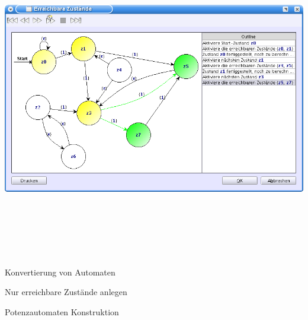 {
  \begin{center}
    \includegraphics[height=14cm]{../images/reachable_states.png}
  \end{center}
}


{
    \begin{itemgroup}{}
	\item Konvertierung von Automaten
		\begin{itemgroup}{}
    	\item Nur erreichbare Zustände anlegen
    	\item Potenzautomaten Konstruktion
    	\end{itemgroup}
	\end{itemgroup}
  
	\vfill{}
}

